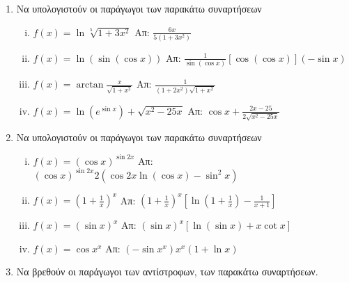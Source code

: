 



\pagestyle{askhseis}




\begin{center}
  \minibox{\large \bfseries \textcolor{Col1}{Ασκήσεις στις Παραγώγους}}
\end{center}

\vspace{\baselineskip}

\begin{enumerate}

  \item Να υπολογιστούν οι παράγωγοι των παρακάτω συναρτήσεων
    \begin{enumerate}[(i)]
      \item $ f(x) = \ln{\sqrt[5]{1+3x^{2}}} $ \hfill Απ: $
        \frac{6x}{5(1+3x^{2})} $
      \item $ f(x) = \ln({\sin({\cos{x}})}) $ \hfill Απ: $
        \frac{1}{\sin{(\cos{x})}} [\cos{(\cos{x})}] (- \sin{x}) $ 
      \item $ f(x) = \arctan \frac{x}{\sqrt{1 + x^{2}}} $ \hfill Απ: $
        \frac{1}{(1+2x^{2})\sqrt{1 + x^{2}}} $
      \item $ f(x) = \ln{(e^{\sin{x}})} + \sqrt{x^{2} - 25x} $ \hfill Απ: $
        \cos{x} + \frac{2x - 25}{2 \sqrt{x^{2} - 25x}}  $  
    \end{enumerate}

  \item  Να υπολογιστούν οι παράγωγοι των παρακάτω συναρτήσεων

    \begin{enumerate}[(i)]
      \item $ f(x) = (\cos{x})^{\sin{2x}} $ \hfill Απ: $
        (\cos{x})^{\sin{2x}} 2(\cos{2x} \ln{(\cos{x})} - \sin^{2}{x}) $
      \item $ f(x) = \left(1 + \frac{1}{x} \right)^{x} $ \hfill Απ: $
        \left(1 + \frac{1}{x}\right)^{x}\left[\ln{(1 + \frac{1}{x})} -
        \frac{1}{x+1}\right] $
      \item $ f(x) = (\sin{x})^{x} $ \hfill Απ: $ (\sin{x})^{x}[\ln{(\sin{x}
        )} + x \cot{x}] $ 
      \item $ f(x) =  \cos{x}^{x} $ \hfill Απ: $ (- \sin{x^{x}})x^{x} (1 +
        \ln{x}) $
    \end{enumerate}

  \item Να βρεθούν οι παράγωγοι των αντίστροφων, των παρακάτω συναρτήσεων.
    \begin{enumerate}[(i)]
  \end{enumerate}


\end{enumerate}
